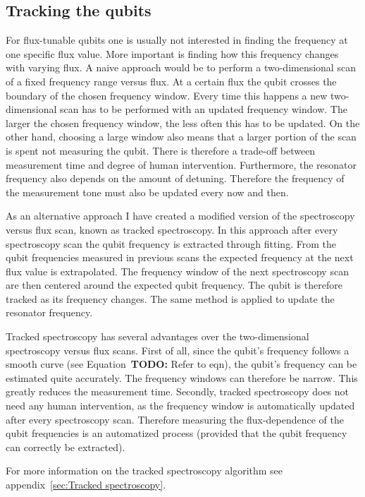       \subsection{Tracking the qubits}
        \label{ssec:tracked spectroscopy}
        For flux-tunable qubits one is usually not interested in finding the frequency at one specific flux value. More important is finding how this frequency changes with varying flux. A naive approach would be to perform a two-dimensional scan of a fixed frequency range versus flux. At a certain flux the qubit crosses the boundary of the chosen frequency window. Every time this happens a new two-dimensional scan has to be performed with an updated frequency window. The larger the chosen frequency window, the less often this has to be updated. On the other hand, choosing a large window also means that a larger portion of the scan is spent not measuring the qubit. There is therefore a trade-off between measurement time and degree of human intervention. Furthermore, the resonator frequency also depends on the amount of detuning. Therefore the frequency of the measurement tone must also be updated every now and then.

        As an alternative approach I have created a modified version of the spectroscopy versus flux scan, known as tracked spectroscopy. In this approach after every spectroscopy scan the qubit frequency is extracted through fitting. From the qubit frequencies measured in previous scans the expected frequency at the next flux value is extrapolated. The frequency window of the next spectroscopy scan are then centered around the expected qubit frequency. The qubit is therefore tracked as its frequency changes. The same method is applied to update the resonator frequency.

        Tracked spectroscopy has several advantages over the two-dimensional spectroscopy versus flux scans. First of all, since the qubit's frequency follows a smooth curve (see Equation~\textbf{TODO:} Refer to eqn), the qubit's frequency can be estimated quite accurately. The frequency windows can therefore be narrow. This greatly reduces the measurement time. Secondly, tracked spectroscopy does not need any human intervention, as the frequency window is automatically updated after every spectroscopy scan. Therefore measuring the flux-dependence of the qubit frequencies is an automatized process (provided that the qubit frequency can correctly be extracted).

        For more information on the tracked spectroscopy algorithm see appendix~\ref{sec:Tracked spectroscopy}.

